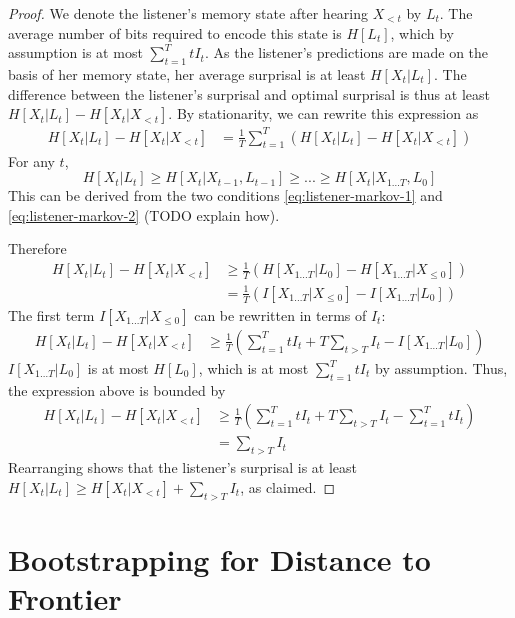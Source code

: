 \documentclass[11pt,letterpaper]{article}
\begin{document}
\begin{proof}
We denote the listener's memory state after hearing $X_{<t}$ by $L_t$.
The average number of bits required to encode this state is $H[L_t]$, which by assumption is at most $\sum_{t=1}^T t I_t$.
As the listener's predictions are made on the basis of her memory state, her average surprisal is at least $H[X_t | L_t]$.
The difference between the listener's surprisal and optimal surprisal is thus at least $H[X_t | L_t] - H[X_t | X_{<t}]$.
By stationarity, we can rewrite this expression as
\begin{align*}
	H[X_t | L_t] - H[X_t | X_{<t}] &=  \frac{1}{T} \sum_{t=1}^{T} \left(H[X_t | L_t] - H[X_t | X_{<t}]\right) 
\end{align*}
For any $t$,
	$$H[X_t | L_t] \geq H[X_t| X_{t-1}, L_{t-1}] \geq ... \geq H[X_t|X_{1 \dots T}, L_0]$$
	This can be derived from the two conditions \ref{eq:listener-markov-1} and \ref{eq:listener-markov-2} (TODO explain how).

Therefore
\begin{align*}
	H[X_t | L_t] - H[X_t | X_{<t}]& \geq   \frac{1}{T} \left(H[X_{1\dots T} | L_0] - H[X_{1\dots T} | X_{\leq 0}]\right)  \\
	& = \frac{1}{T} \left(I[X_{1\dots T}|X_{\leq 0}] - I[X_{1\dots T}|L_0]\right) 
\end{align*}
	The first term $I[X_{1\dots T}|X_{\leq 0}]$ can be rewritten in terms of $I_t$:
\begin{align*}
	H[X_t | L_t] - H[X_t | X_{<t}]& \geq \frac{1}{T} \left(\sum_{t=1}^T t I_t + T \sum_{t > T} I_t - I[X_{1\dots T}|L_0]\right) 
\end{align*}
	$I[X_{1\dots T}|L_0]$ is at most $H[L_0]$, which is at most $\sum_{t=1}^T t I_t$ by assumption. Thus, the expression above is bounded by
	\begin{align*}
	H[X_t | L_t] - H[X_t | X_{<t}]& \geq \frac{1}{T} \left(\sum_{t=1}^T t I_t + T \sum_{t > T} I_t - \sum_{t=1}^T t I_t\right) \\
		&= \sum_{t > T} I_t
\end{align*}
	Rearranging shows that the listener's surprisal is at least $H[X_t|L_t] \geq H[X_t | X_{<t}] + \sum_{t > T} I_t$, as claimed.
\end{proof}





\section{Bootstrapping for Distance to Frontier}
\end{document}
